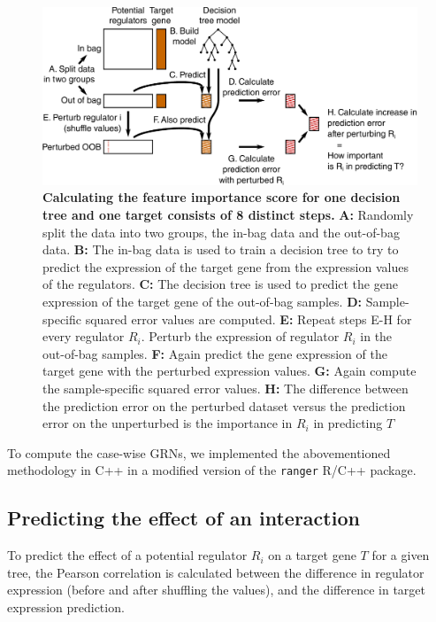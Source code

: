 \begin{figure}[htb!]
	\centering
	\includegraphics[width=.9\linewidth]{fig/methodology/fimp.pdf} 
	\caption{
		\textbf{Calculating the feature importance score for one decision tree and one target consists of 8 distinct steps.}
		\textbf{A:} Randomly split the data into two groups, the in-bag data and the out-of-bag data.
		\textbf{B:} The in-bag data is used to train a decision tree to try to predict the expression of the target gene from the expression values of the regulators.
		\textbf{C:} The decision tree is used to predict the gene expression of the target gene of the out-of-bag samples.
		\textbf{D:} Sample-specific squared error values are computed.
		\textbf{E:} Repeat steps E-H for every regulator $R_i$. Perturb the expression of regulator $R_i$ in the out-of-bag samples.
		\textbf{F:} Again predict the gene expression of the target gene with the perturbed expression values.
		\textbf{G:} Again compute the sample-specific squared error values.
		\textbf{H:} The difference between the prediction error on the perturbed dataset versus the prediction error on the unperturbed is the importance in $R_i$ in predicting $T$ 
	}
	\label{fig:fimp}
\end{figure}

To compute the case-wise GRNs, we implemented the abovementioned methodology in C++ in a modified version of the \texttt{ranger} R/C++ package\cite{wright_rangerfastimplementation_2017}.

\subsection{Predicting the effect of an interaction}
To predict the effect of a potential regulator $R_i$ on a target gene $T$ for a given tree, the Pearson correlation is calculated between the difference in regulator expression (before and after shuffling the values), and the difference in target expression prediction. 

